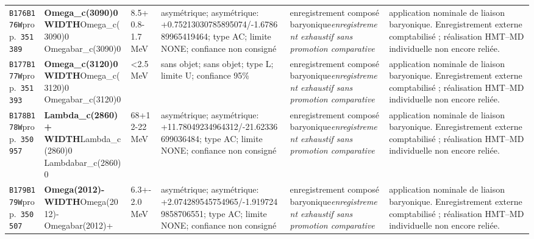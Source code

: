 \begin{landscape}
\begin{longtable}{L{1.85cm}L{4.45cm}L{2.35cm}L{4.05cm}L{3.35cm}L{7.15cm}}
\texttt{B176}\newline \texttt{B176W}\newline prop.\ \texttt{351389} & \textbf{Omega\_\allowbreak{}c(3090)0 WIDTH}\newline Omega\_\allowbreak{}c(3090)0 \textbar{}\allowbreak{} Omegabar\_\allowbreak{}c(3090)0 & 8.5+0.8-1.7\,MeV & asymétrique; asymétrique: +0.75213030785895074/-1.678689965419464; type AC; limite NONE; confiance non consigné & enregistrement composé baryonique\newline \emph{enregistrement exhaustif sans promotion comparative} & application nominale de liaison baryonique. Enregistrement externe comptabilisé ; réalisation HMT--MD individuelle non encore reliée. \\
\texttt{B177}\newline \texttt{B177W}\newline prop.\ \texttt{351393} & \textbf{Omega\_\allowbreak{}c(3120)0 WIDTH}\newline Omega\_\allowbreak{}c(3120)0 \textbar{}\allowbreak{} Omegabar\_\allowbreak{}c(3120)0 & \textless{}2.5\,MeV & sans objet; sans objet; type L; limite U; confiance 95\% & enregistrement composé baryonique\newline \emph{enregistrement exhaustif sans promotion comparative} & application nominale de liaison baryonique. Enregistrement externe comptabilisé ; réalisation HMT--MD individuelle non encore reliée. \\
\texttt{B178}\newline \texttt{B178W}\newline prop.\ \texttt{350957} & \textbf{Lambda\_\allowbreak{}c(2860)+ WIDTH}\newline Lambda\_\allowbreak{}c(2860)0 \textbar{}\allowbreak{} Lambdabar\_\allowbreak{}c(2860)0 & 68+12-22\,MeV & asymétrique; asymétrique: +11.78049234964312/-21.62336699036484; type AC; limite NONE; confiance non consigné & enregistrement composé baryonique\newline \emph{enregistrement exhaustif sans promotion comparative} & application nominale de liaison baryonique. Enregistrement externe comptabilisé ; réalisation HMT--MD individuelle non encore reliée. \\
\texttt{B179}\newline \texttt{B179W}\newline prop.\ \texttt{350507} & \textbf{Omega(2012)- WIDTH}\newline Omega(2012)- \textbar{}\allowbreak{} Omegabar(2012)+ & 6.3+-2.0\,MeV & asymétrique; asymétrique: +2.074289545754965/-1.9197249858706551; type AC; limite NONE; confiance non consigné & enregistrement composé baryonique\newline \emph{enregistrement exhaustif sans promotion comparative} & application nominale de liaison baryonique. Enregistrement externe comptabilisé ; réalisation HMT--MD individuelle non encore reliée. \\

\end{longtable}
\end{landscape}
